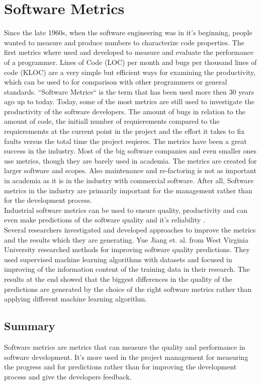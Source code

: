 \section{Software Metrics}
Since the late 1960s, when the software engineering was in it's beginning, people wanted to measure and produce numbers to characterize code properties. 
The first metrics where used and developed to measure and evaluate the performance of a programmer. Lines of Code (LOC) per month and bugs per thousand lines of code (KLOC) are a very simple but efficient ways for examining the productivity, which can be used to for comparison with other programmers or general standards.
\bigbreak
``Software Metrics`` is the term that has been used more then 30 years ago up to today.
Today, some of the most metrics are still used to investigate the productivity of the software developers. The amount of bugs in relation to the amount of code, the initiall number of requierements compared to the requierememts at the current point in the project and the effort it takes to fix faults versus the total time the project reqieres. \cite{kaner2004software}
The metrics have been a great success in the industry. Most of the big software companies and even smaller ones use metrics, though they are barely used in academia. 
The metrics are created for larger software and scopes. Also maintenance and re-factoring is not as important in academia as it is in the industry with commercial software. After all, Software metrics in the industry are primarily important for the management rather than for the development process.\\
Industrial software metrics can be used to ensure quality, productivity and can even make predictions of the software quality and it's reliability \cite{fenton1999software}.\\
Several researchers investigated and developed approaches to improve the metrics and the results which they are generating. 
Yue Jiang et. al. \cite{jiang2008comparing} from West Virginia University researched methods for improving software quality predictions. They used supervised machine learning algorithms with datasets and focused in improving of the information content of the training data in their research. The results at the end showed that the biggest differences in the quality of the predictions are generated by the choice of the right software metrics rather than applying different machine learning algorithm. 

\subsection{Summary}
Software metrics are metrics that can measure the quality and performance in software development. It's more used in the project management for measuring the progress and for predictions rather than for improving the development process and give the developers feedback. 


